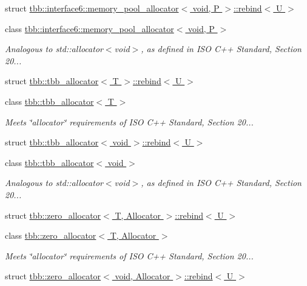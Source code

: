 \begin{DoxyCompactItemize}
struct \hyperlink{structtbb_1_1interface6_1_1memory__pool__allocator_3_01void_00_01P_01_4_1_1rebind}{tbb\+::interface6\+::memory\+\_\+pool\+\_\+allocator$<$ void, P $>$\+::rebind$<$ U $>$}
\item 
class \hyperlink{classtbb_1_1interface6_1_1memory__pool__allocator_3_01void_00_01P_01_4}{tbb\+::interface6\+::memory\+\_\+pool\+\_\+allocator$<$ void, P $>$}
\begin{DoxyCompactList}\small\item\em Analogous to std\+::allocator$<$void$>$, as defined in I\+S\+O C++ Standard, Section 20... \end{DoxyCompactList}\item 
struct \hyperlink{structtbb_1_1tbb__allocator_1_1rebind}{tbb\+::tbb\+\_\+allocator$<$ T $>$\+::rebind$<$ U $>$}
\item 
class \hyperlink{classtbb_1_1tbb__allocator}{tbb\+::tbb\+\_\+allocator$<$ T $>$}
\begin{DoxyCompactList}\small\item\em Meets \char`\"{}allocator\char`\"{} requirements of I\+S\+O C++ Standard, Section 20... \end{DoxyCompactList}\item 
struct \hyperlink{structtbb_1_1tbb__allocator_3_01void_01_4_1_1rebind}{tbb\+::tbb\+\_\+allocator$<$ void $>$\+::rebind$<$ U $>$}
\item 
class \hyperlink{classtbb_1_1tbb__allocator_3_01void_01_4}{tbb\+::tbb\+\_\+allocator$<$ void $>$}
\begin{DoxyCompactList}\small\item\em Analogous to std\+::allocator$<$void$>$, as defined in I\+S\+O C++ Standard, Section 20... \end{DoxyCompactList}\item 
struct \hyperlink{structtbb_1_1zero__allocator_1_1rebind}{tbb\+::zero\+\_\+allocator$<$ T, Allocator $>$\+::rebind$<$ U $>$}
\item 
class \hyperlink{classtbb_1_1zero__allocator}{tbb\+::zero\+\_\+allocator$<$ T, Allocator $>$}
\begin{DoxyCompactList}\small\item\em Meets \char`\"{}allocator\char`\"{} requirements of I\+S\+O C++ Standard, Section 20... \end{DoxyCompactList}\item 
struct \hyperlink{structtbb_1_1zero__allocator_3_01void_00_01Allocator_01_4_1_1rebind}{tbb\+::zero\+\_\+allocator$<$ void, Allocator $>$\+::rebind$<$ U $>$}

\end{DoxyCompactItemize}
